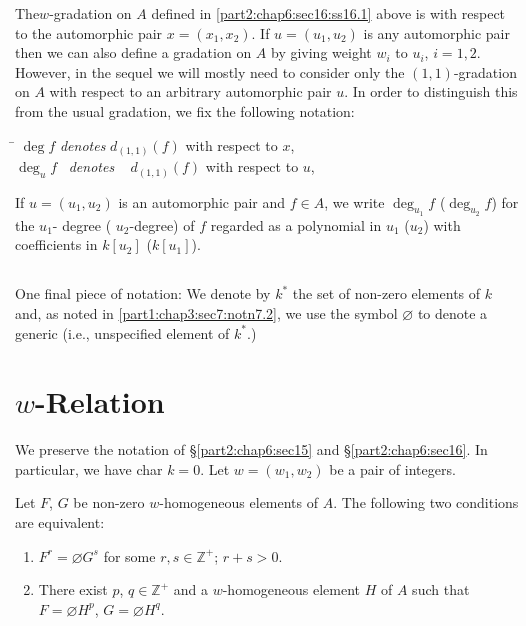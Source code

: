 The\pageoriginale $w$-gradation on $A$ defined in
\ref{part2:chap6:sec16:ss16.1} above is with respect to the
automorphic pair $x= (x_1, x_2)$. If $u= (u_1, u_2)$ is any
automorphic pair then we can also define a gradation on $A$ by giving
weight $w_i$ to $u_i$, $i=1, 2$. However, in the sequel we will mostly
need to consider only the $(1,1)$-gradation on $A$ with respect to an
arbitrary automorphic pair $u$. In order to distinguish this from the
usual gradation, we fix the following notation:

\begin{tabbing}
  \qquad\qquad  \= $\deg f $ \; \= {\em denotes} $d_{(1,1)}(f)$ with
  respect to $x$,\\ 
   \> $\deg_u f $~ \> {\em denotes }~ $d_{(1,1)}(f)$ with respect to $u$,
\end{tabbing}

If $u=(u_1, u_2)$ is an automorphic pair and $f \in A$, we write
$\deg_{u_1} f$ (\resp $\deg_{u_2}f$) for the $u_1$- degree (\resp
$u_2$-degree) of $f$ regarded as a polynomial in $u_1$ (\resp $u_2$)
with coefficients in $k[u_2]$ (\resp $k[u_1]$).

\subsection{} \label{part2:chap6:sec16:ss16.3}

One final piece of notation: We denote by $k^*$ the set of non-zero
elements of $k$ and, as noted in \ref{part1:chap3:sec7:notn7.2}, we
use the symbol $\diameter$ to denote a generic (i.e., unspecified
element of $k^*$.)

\section{$w$-Relation}\label{part2:chap6:sec17}

We preserve the notation of \S \ref{part2:chap6:sec15} and
\S \ref{part2:chap6:sec16}. In particular, we have char $k=0$. Let $w=
(w_1, w_2)$ be a pair of integers. 

\begin{lemma}\label{part2:chap6:sec17:lem17.1}
  Let $F$, $G$ be non-zero $w$-homogeneous elements of $A$. The
  following two conditions are equivalent:
  \begin{enumerate}[\rm (1)]
    \item $F^r = \diameter G^s$ for some $r, s \in \mathbb{Z}^+$;
      $r+s> 0$.
      \item There exist $p$, $q \in \mathbb{Z}^+$ and a
        $w$-homogeneous element $H$ of $A$ such that $F= \diameter
        H^p$, $G= \diameter H^q$.
  \end{enumerate}
\end{lemma}

